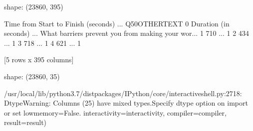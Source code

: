 \documentclass[letterpaper,10pt,english]{jupyterBook}
\begin{document}
\begin{sphinxVerbatim}[commandchars=\\\{\}]
shape: (23860, 395)
\end{sphinxVerbatim}

\begin{sphinxVerbatim}[commandchars=\\\{\}]
  Time from Start to Finish (seconds)  ...                                     Q50\PYGZus{}OTHER\PYGZus{}TEXT
0               Duration (in seconds)  ...  What barriers prevent you from making your wor...
1                                 710  ...                                                 \PYGZhy{}1
2                                 434  ...                                                 \PYGZhy{}1
3                                 718  ...                                                 \PYGZhy{}1
4                                 621  ...                                                 \PYGZhy{}1

[5 rows x 395 columns]
\end{sphinxVerbatim}

\begin{sphinxVerbatim}[commandchars=\\\{\}]
  
  
\end{sphinxVerbatim}

\begin{sphinxVerbatim}[commandchars=\\\{\}]
shape: (23860, 35)
\end{sphinxVerbatim}

\begin{sphinxVerbatim}[commandchars=\\\{\}]
/usr/local/lib/python3.7/dist\PYGZhy{}packages/IPython/core/interactiveshell.py:2718: DtypeWarning: Columns (25) have mixed types.Specify dtype option on import or set low\PYGZus{}memory=False.
  interactivity=interactivity, compiler=compiler, result=result)
\end{sphinxVerbatim}
\end{document}
